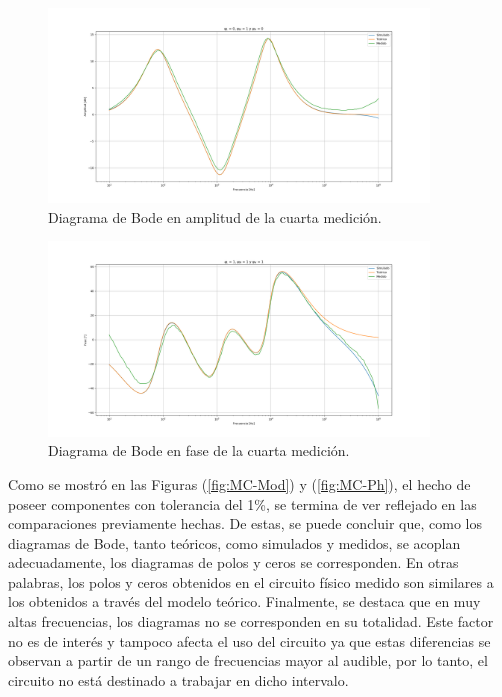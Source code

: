 \begin{figure}[H]	
	\centering
	\includegraphics[width=0.9\textwidth]{Imagenes/CBodes-Mod-1.png}
	\caption{Diagrama de Bode en amplitud de la cuarta medición.}
	\label{fig:CBodes-Mod-4}
\end{figure}
\begin{figure}[H]	
	\centering
	\includegraphics[width=0.9\textwidth]{Imagenes/CBodes-Ph-4.png}
	\caption{Diagrama de Bode en fase de la cuarta medición.}
	\label{fig:CBodes-Ph-4}
\end{figure}

Como se mostró en las Figuras (\ref{fig:MC-Mod}) y (\ref{fig:MC-Ph}), el hecho de poseer componentes con tolerancia del 1\%, se termina de ver reflejado en las comparaciones previamente hechas. De estas, se puede concluir que, como los diagramas de Bode, tanto teóricos, como simulados y medidos, se acoplan adecuadamente, los diagramas de polos y ceros se corresponden. En otras palabras, los polos y ceros obtenidos en el circuito físico medido son similares a los obtenidos a través del modelo teórico. Finalmente, se destaca que en muy altas frecuencias, los diagramas no se corresponden en su totalidad. Este factor no es de interés y tampoco afecta el uso del circuito ya que estas diferencias se observan a partir de un rango de frecuencias mayor al audible, por lo tanto, el circuito no está destinado a trabajar en dicho intervalo.

